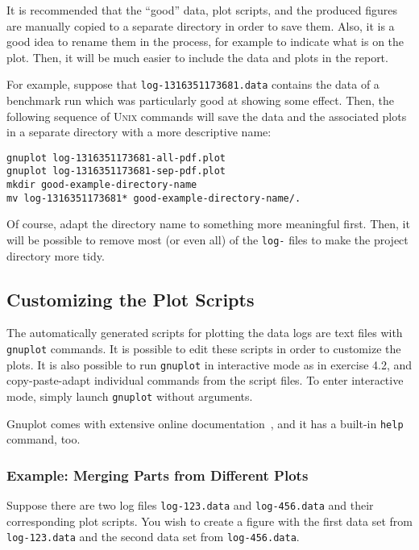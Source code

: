 \documentclass[a4paper,10pt]{article}
\begin{document}
It is recommended that the ``good'' data, plot scripts, and the produced figures are manually copied to a separate directory in order to save them.
Also, it is a good idea to rename them in the process, for example to indicate what is on the plot.
Then, it will be much easier to include the data and plots in the report.

For example, suppose that \texttt{log-1316351173681.data} contains the data of a benchmark run which was particularly good at showing some effect.
Then, the following sequence of \textsc{Unix} commands will save the data and the associated plots in a separate directory with a more descriptive name:

\begin{verbatim}
gnuplot log-1316351173681-all-pdf.plot
gnuplot log-1316351173681-sep-pdf.plot
mkdir good-example-directory-name
mv log-1316351173681* good-example-directory-name/.
\end{verbatim}

Of course, adapt the directory name to something more meaningful first.
Then, it will be possible to remove most (or even all) of the \texttt{log-} files to make the project directory more tidy.



\subsection{Customizing the Plot Scripts}

The automatically generated scripts for plotting the data logs are text files with \texttt{gnuplot} commands.
It is possible to edit these scripts in order to customize the plots.
It is also possible to run \texttt{gnuplot} in interactive mode as in exercise 4.2, and copy-paste-adapt individual commands from the script files.
To enter interactive mode, simply launch \texttt{gnuplot} without arguments.

Gnuplot comes with extensive online documentation~\cite{gnuplot}, and it has a built-in \texttt{help} command, too.



\subsubsection*{Example: Merging Parts from Different Plots}

Suppose there are two log files \texttt{log-123.data} and \texttt{log-456.data} and their corresponding plot scripts.
You wish to create a figure with the first data set from \texttt{log-123.data} and the second data set from \texttt{log-456.data}.
\end{document}
